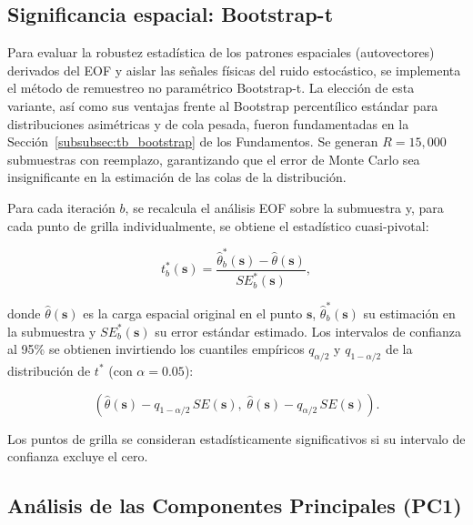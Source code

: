 \subsection{Significancia espacial: Bootstrap-t}\label{subsec:bootstrap_significancia}

Para evaluar la robustez estadística de los patrones espaciales (autovectores) derivados del EOF y aislar las señales físicas del ruido estocástico, se implementa el método de remuestreo no paramétrico Bootstrap-t. La elección de esta variante, así como sus ventajas frente al Bootstrap percentílico estándar para distribuciones asimétricas y de cola pesada, fueron fundamentadas en la Sección~\ref{subsubsec:tb_bootstrap} de los Fundamentos. Se generan $R = 15{,}000$ submuestras con reemplazo, garantizando que el error de Monte Carlo sea insignificante en la estimación de las colas de la distribución.

Para cada iteración $b$, se recalcula el análisis EOF sobre la submuestra y, para cada punto de grilla individualmente, se obtiene el estadístico cuasi-pivotal:

\begin{equation}
    t^*_b(\mathbf{s}) = \frac{\hat{\theta}^*_b(\mathbf{s}) - \hat{\theta}(\mathbf{s})}{SE^*_b(\mathbf{s})},
\end{equation}

donde $\hat{\theta}(\mathbf{s})$ es la carga espacial original en el punto $\mathbf{s}$, $\hat{\theta}^*_b(\mathbf{s})$ su estimación en la submuestra y $SE^*_b(\mathbf{s})$ su error estándar estimado. Los intervalos de confianza al 95\% se obtienen invirtiendo los cuantiles empíricos $q_{\alpha/2}$ y $q_{1-\alpha/2}$ de la distribución de $t^*$ (con $\alpha = 0.05$):

\begin{equation}
    \left(\hat{\theta}(\mathbf{s}) - q_{1-\alpha/2}\,SE(\mathbf{s}),\; \hat{\theta}(\mathbf{s}) - q_{\alpha/2}\,SE(\mathbf{s})\right).
\end{equation}

Los puntos de grilla se consideran estadísticamente significativos si su intervalo de confianza excluye el cero.

\subsection{Análisis de las Componentes Principales (PC1)}\label{subsec:analisis_pc}

